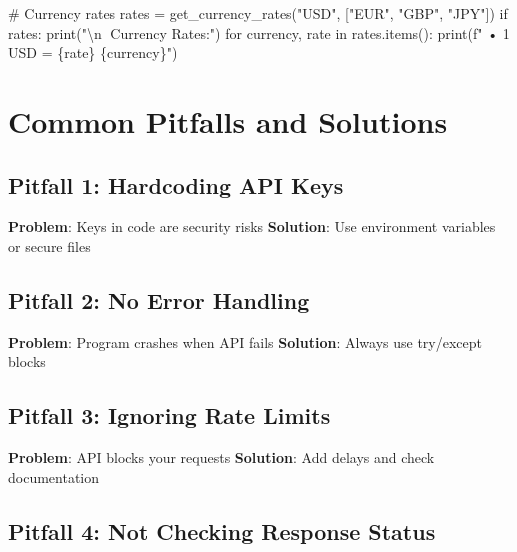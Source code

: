 \documentclass[
  letterpaper,
  DIV=11,
  numbers=noendperiod,
  oneside]{scrreprt}
\newenvironment{Shaded}{}{}
\newcommand{\BuiltInTok}[1]{\textcolor[rgb]{0.84,0.23,0.29}{#1}}
\newcommand{\CharTok}[1]{\textcolor[rgb]{0.01,0.18,0.38}{#1}}
\newcommand{\CommentTok}[1]{\textcolor[rgb]{0.42,0.45,0.49}{#1}}
\newcommand{\ControlFlowTok}[1]{\textcolor[rgb]{0.84,0.23,0.29}{#1}}
\newcommand{\KeywordTok}[1]{\textcolor[rgb]{0.84,0.23,0.29}{#1}}
\newcommand{\NormalTok}[1]{\textcolor[rgb]{0.14,0.16,0.18}{#1}}
\newcommand{\OperatorTok}[1]{\textcolor[rgb]{0.14,0.16,0.18}{#1}}
\newcommand{\SpecialCharTok}[1]{\textcolor[rgb]{0.00,0.36,0.77}{#1}}
\newcommand{\SpecialStringTok}[1]{\textcolor[rgb]{0.01,0.18,0.38}{#1}}
\newcommand{\StringTok}[1]{\textcolor[rgb]{0.01,0.18,0.38}{#1}}
\begin{document}
\begin{Shaded}
\begin{Highlighting}[]
    \CommentTok{\# Currency rates}
\NormalTok{    rates }\OperatorTok{=}\NormalTok{ get\_currency\_rates(}\StringTok{"USD"}\NormalTok{, [}\StringTok{"EUR"}\NormalTok{, }\StringTok{"GBP"}\NormalTok{, }\StringTok{"JPY"}\NormalTok{])}
    \ControlFlowTok{if}\NormalTok{ rates:}
        \BuiltInTok{print}\NormalTok{(}\StringTok{"}\CharTok{\textbackslash{}n}\StringTok{💱 Currency Rates:"}\NormalTok{)}
        \ControlFlowTok{for}\NormalTok{ currency, rate }\KeywordTok{in}\NormalTok{ rates.items():}
            \BuiltInTok{print}\NormalTok{(}\SpecialStringTok{f"  • 1 USD = }\SpecialCharTok{\{}\NormalTok{rate}\SpecialCharTok{\}}\SpecialStringTok{ }\SpecialCharTok{\{}\NormalTok{currency}\SpecialCharTok{\}}\SpecialStringTok{"}\NormalTok{)}
\end{Highlighting}
\end{Shaded}

\section{Common Pitfalls and
Solutions}\label{common-pitfalls-and-solutions-1}

\subsection{Pitfall 1: Hardcoding API
Keys}\label{pitfall-1-hardcoding-api-keys}

\textbf{Problem}: Keys in code are security risks \textbf{Solution}: Use
environment variables or secure files

\subsection{Pitfall 2: No Error
Handling}\label{pitfall-2-no-error-handling}

\textbf{Problem}: Program crashes when API fails \textbf{Solution}:
Always use try/except blocks

\subsection{Pitfall 3: Ignoring Rate
Limits}\label{pitfall-3-ignoring-rate-limits}

\textbf{Problem}: API blocks your requests \textbf{Solution}: Add delays
and check documentation

\subsection{Pitfall 4: Not Checking Response
Status}\label{pitfall-4-not-checking-response-status}
\end{document}
